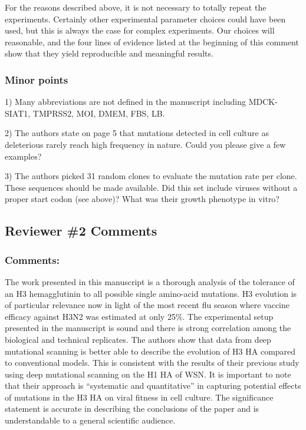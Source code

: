 \documentclass[11pt, oneside]{article}   	%
\newcommand{\response}[1]{{\color{black}#1}}
\begin{document}
\response{For the reasons described above, it is not necessary to totally repeat the experiments.
Certainly other experimental parameter choices could have been used, but this is always the case for complex experiments.
Our choices will reasonable, and the four lines of evidence listed at the beginning of this comment show that they yield reproducible and meaningful results.}

\subsubsection*{Minor points} 

1) Many abbreviations are not defined in the manuscript including MDCK-SIAT1, TMPRSS2, MOI, DMEM, FBS, LB. 

2) The authors state on page 5 that mutations detected in cell culture as deleterious rarely reach high frequency in nature. Could you please give a few examples? 

3) The authors picked 31 random clones to evaluate the mutation rate per clone. These sequences should be made available. Did this set include viruses without a proper start codon (see above)? What was their growth phenotype in vitro? 

\subsection*{Reviewer \#2 Comments} 

\subsubsection*{Comments:} 
The work presented in this manuscript is a thorough analysis of the tolerance of an H3 hemagglutinin to all possible single amino-acid mutations. H3 evolution is of particular relevance now in light of the most recent flu season where vaccine efficacy against H3N2 was estimated at only 25\%. The experimental setup presented in the manuscript is sound and there is strong correlation among the biological and technical replicates. The authors show that data from deep mutational scanning is better able to describe the evolution of H3 HA compared to conventional models. This is consistent with the results of their previous study using deep mutational scanning on the H1 HA of WSN. It is important to note that their approach is ``systematic and quantitative'' in capturing potential effects of mutations in the H3 HA on viral fitness in cell culture. The significance statement is accurate in describing the conclusions of the paper and is understandable to a general scientific audience. 
\end{document}
